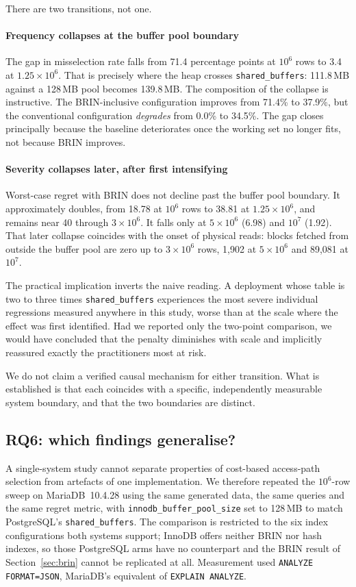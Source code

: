 \documentclass[preprint,12pt,authoryear]{elsarticle}
\newcommand{\sbuf}{\texttt{shared\_buffers}}
\begin{document}
There are two transitions, not one.

\paragraph{Frequency collapses at the buffer pool boundary}
The gap in misselection rate falls from 71.4 percentage points at
$10^6$ rows to 3.4 at $1.25 \times 10^6$. That is precisely where the
heap crosses \sbuf{}: 111.8\,MB against a 128\,MB pool becomes
139.8\,MB. The composition of the collapse is instructive. The
BRIN-inclusive configuration improves from 71.4\% to 37.9\%, but the
conventional configuration \emph{degrades} from 0.0\% to 34.5\%. The
gap closes principally because the baseline deteriorates once the
working set no longer fits, not because BRIN improves.

\paragraph{Severity collapses later, after first intensifying}
Worst-case regret with BRIN does not decline past the buffer pool
boundary. It approximately doubles, from 18.78 at $10^6$ rows to 38.81
at $1.25 \times 10^6$, and remains near 40 through $3 \times 10^6$. It
falls only at $5 \times 10^6$ (6.98) and $10^7$ (1.92). That later
collapse coincides with the onset of physical reads: blocks fetched
from outside the buffer pool are zero up to $3 \times 10^6$ rows,
1{,}902 at $5 \times 10^6$ and 89{,}081 at $10^7$.

The practical implication inverts the naive reading. A deployment whose
table is two to three times \sbuf{} experiences the most severe
individual regressions measured anywhere in this study, worse than at
the scale where the effect was first identified. Had we reported only
the two-point comparison, we would have concluded that the penalty
diminishes with scale and implicitly reassured exactly the
practitioners most at risk.

We do not claim a verified causal mechanism for either transition. What
is established is that each coincides with a specific, independently
measurable system boundary, and that the two boundaries are distinct.

\subsection{RQ6: which findings generalise?}
\label{sec:crossdbms}

A single-system study cannot separate properties of cost-based
access-path selection from artefacts of one implementation. We
therefore repeated the $10^6$-row sweep on MariaDB~10.4.28 using the
same generated data, the same queries and the same regret metric,
with \texttt{innodb\_buffer\_pool\_size} set to 128\,MB to match
PostgreSQL's \sbuf{}. The comparison is restricted to the six index
configurations both systems support; InnoDB offers neither BRIN nor
hash indexes, so those PostgreSQL arms have no counterpart and the
BRIN result of Section~\ref{sec:brin} cannot be replicated at all.
Measurement used \texttt{ANALYZE FORMAT=JSON}, MariaDB's equivalent of
\texttt{EXPLAIN ANALYZE}.
\end{document}
